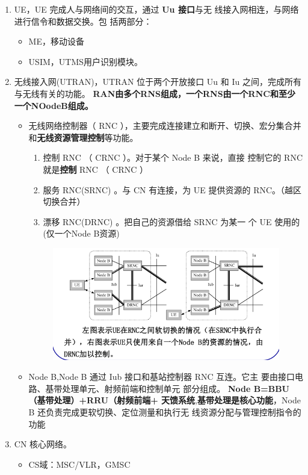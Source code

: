 \begin{enumerate}
	\item UE，UE 完成人与网络间的交互，通过\textbf{ Uu 接口}与无
	线接入网相连，与网络进行信令和数据交换。包
	括两部分：
	\begin{itemize}
		\item ME，移动设备
		\item USIM，UTMS用户识别模块。
	\end{itemize}
	\item 无线接入网(UTRAN)，UTRAN 位于两个开放接口 Uu 和 Iu 之间，完成所有
	与无线有关的功能。
\textbf{	RAN由多个RNS组成，一个RNS由一个RNC和至少一个NOodeB组成。}
	\begin{itemize}
		\item 无线网络控制器（ RNC ），主要完成连接建立和断开、切换、宏分集合并
		和\textbf{无线资源管理控制}等功能。
		\begin{enumerate}
			\item 控制 RNC （ CRNC ）。对于某个 Node B 来说，直接
			控制它的 RNC 就是\textbf{控制} RNC （ CRNC ）
			\item 服务 RNC(SRNC) 。与 CN 有连接，为 UE 提供资源的
			RNC。（越区切换合并）
			\item 漂移 RNC(DRNC) 。把自己的资源借给 SRNC 为某一
			个 UE 使用的(仅一个Node B资源)
		\end{enumerate}
		\begin{figure}[H]
			\centering
			\includegraphics[width=0.7\linewidth]{figures/screenshot012}
			\caption{}
			\label{fig:screenshot012}
		\end{figure}
		\item Node B,Node B 通过 Iub 接口和基站控制器 RNC 互连。它主
		要由接口电路、基带处理单元、射频前端和控制单元
		部分组成。\textbf{ Node B=BBU（基带处理）+RRU（射频前端+ 天馈系统},\textbf{基带处理是核心功能}，Node B 还负责完成更软切换、定位测量和执行无
		线资源分配与管理控制指令的功能
	\end{itemize}
	\item  CN 核心网络。
	\begin{itemize}
		\item CS域：MSC/VLR，GMSC

\end{itemize}
\end{enumerate}
